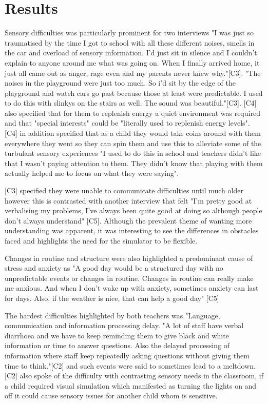 \documentclass[11pt]{report}
\begin{document}
\section{Results}

Sensory difficulties was particularly prominent for two interviews "I was just so traumatised by the time I got to school with all these different noises, smells in the car and overload of sensory information. I'd just sit in silence and I couldn’t explain to anyone around me what was going on. When I finally arrived home, it just all came out as anger, rage even and my parents never knew why."[C3]. "The noises in the playground were just too much. So i'd sit by the edge of the playground and watch cars go past because those at least were predictable. I used to do this with slinkys on the stairs as well. The sound was beautiful."[C3]. [C4] also specified that for them to replenish energy a quiet environment was required and that "special interests" could be "literally used to replenish energy levels". [C4] in addition specified that as a child they would take coins around with them everywhere they went so they can spin them and use this to alleviate some of the turbulant sensory experiences "I used to do this in school and teachers didn't like that I wasn't paying attention to them. They didn't know that playing with them actually helped me to focus on what they were saying".

[C3] specified they were unable to communicate difficulties until much older however this is contrasted with another interview that felt "I'm pretty good at verbalising my problems, I've always been quite good at doing so although people don't always understand" [C5]. Although the prevalent theme of wanting more understanding was apparent, it was interesting to see the differences in obstacles faced and highlights the need for the simulator to be flexible. 

Changes in routine and structure were also highlighted a predominant cause of stress and anxiety as "A good day would be a structured day with no unpredictable events or changes in routine. Changes in routine can really make me anxious. And when I don't wake up with anxiety, sometimes anxiety can last for days. Also, if the weather is nice, that can help a good day" [C5]

The hardest difficulties highlighted by both teachers was "Language, communication and information processing delay. "A lot of staff have verbal diarrhoea and we have to keep reminding them to give black and white information or time to answer questions. Also the delayed processing of information where staff keep repeatedly asking questions without giving them time to think."[C2] and such events were said to sometimes lead to a meltdown. [C2] also spoke of the difficulty with contrasting sensory needs in the classroom, if a child required visual simulation which manifested as turning the lights on and off it could cause sensory issues for another child whom is sensitive. 
\end{document}
